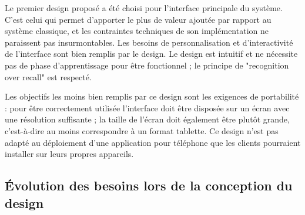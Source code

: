 \documentclass[a4paper,12pt]{article}
\begin{document}
Le premier design proposé a été choisi pour l'interface principale du système. C'est celui qui permet d'apporter le plus de valeur ajoutée par rapport au système classique, et les contraintes techniques de son implémentation ne paraissent pas insurmontables. Les besoins de personnalisation et d'interactivité de l'interface sont bien remplis par le design. Le design est intuitif et ne nécessite pas de phase d'apprentissage pour être fonctionnel ; le  principe de "recognition over recall" est respecté.

Les objectifs les moins bien remplis par ce design sont les exigences de portabilité : pour être correctement utilisée l'interface doit être disposée sur un écran avec une résolution suffisante ; la taille de l'écran doit également être plutôt grande, c'est-à-dire au moins correspondre à un format tablette. Ce design n'est pas adapté au déploiement d'une application pour téléphone que les clients pourraient installer sur leurs propres appareils.

\subsection{Évolution des besoins lors de la conception du design}
\end{document}
